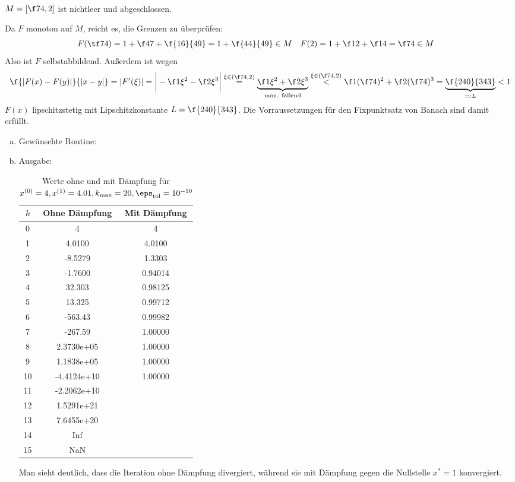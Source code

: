 \documentclass[a4paper]{scrartcl}
\begin{document}
\begin{aufgabe}~

	$M = [\f 74, 2]$ ist nichtleer und abgeschlossen.

	Da $F$ monoton auf $M$, reicht es, die Grenzen zu überprüfen:
	\begin{align*}
		F(\tf 74) &= 1 + \f 47 + \f {16}{49} = 1 + \f {44}{49} \in M &
		F(2) &= 1 + \f 12 + \f 14 = \f 74 \in M
	\end{align*}
	Also ist $F$ selbstabbildend.
	Außerdem ist wegen
	\[
		\f {|F(x) - F(y)|}{|x-y|} 
		= |F'(\xi)| 
		= \bigg| - \f 1{\xi^2} - \f 2{\xi^3} \bigg| \stackrel{\xi \in (\f 74, 2)}
		= \underbrace{\f 1{\xi^2} + \f 2{\xi^3} }_{\text{mon. fallend}} 
		\stackrel{\xi \in (\f 74, 2)}< \f 1{(\f 74)^2} + \f 2{(\f 74)^3} 
		= \underbrace{\f {240}{343}}_{=:L} < 1
	\]
	$F(x)$ lipschitzstetig mit Lipschitzkonstante $L = \f {240}{343}$.
	Die Vorraussetzungen für den Fixpunktsatz von Banach sind damit erfüllt.
\end{aufgabe}

\setcounter{aufgabe}{3}
 
\begin{aufgabe}
	
	\begin{enumerate}[a)]
		\item
			Gewünschte Routine:
			
		\item
			Ausgabe:
			
			\begin{table}[h]
				\caption{Werte ohne und mit Dämpfung für $x^{(0)}=4, x^{(1)}=4.01, k_{\text{max}}=20, \eps_{\text{tol}}=10^{-10}$}
				\centering
				\begin{tabular}{c|c|c}
					$k$ & Ohne Dämpfung & Mit Dämpfung \\ \hline
					0 & 4 & 4 \\
					1 & 4.0100 & 4.0100 \\
					2 & -8.5279 & 1.3303 \\
					3 & -1.7600 & 0.94014 \\
					4 & 32.303 & 0.98125 \\
					5 & 13.325 & 0.99712 \\
					6 & -563.43 & 0.99982 \\
					7 & -267.59 & 1.00000 \\
					8 & 2.3730e+05 & 1.00000 \\
					9 & 1.1838e+05 & 1.00000 \\
					10 & -4.4124e+10 & 1.00000 \\
					11 & -2.2062e+10 &  \\
					12 & 1.5291e+21 &  \\
					13 & 7.6455e+20 & \\
					14 & Inf & \\
					15 & NaN
				\end{tabular}				
			\end{table}
			Man sieht deutlich, dass die Iteration ohne Dämpfung divergiert, während sie mit Dämpfung gegen die Nullstelle $x^* = 1$ konvergiert.

	\end{enumerate}
\end{aufgabe}
\end{document}
